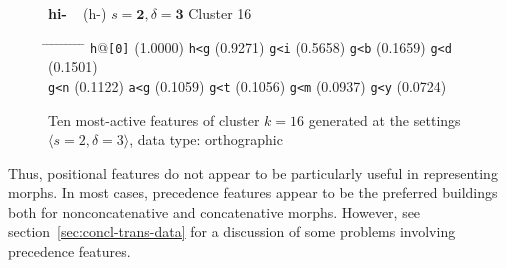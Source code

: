 \begin{figure}[ht] 
\begin{mdframed}
{\LARGE \textbf{hi-}} {\large\,\,\, (h-)} \hfill \large{$s=\textbf{2}, \delta=\textbf{3}$} \hfill Cluster 16\\
\vspace{-6pt}
\begin{normalsize}
\begin{tabbing}
\hspace{6ex} \= \hspace{10ex} \= \hspace{6ex} \= \hspace{10ex} \= \hspace{6ex} \= \hspace{10ex} \= \hspace{6ex} \= \hspace{10ex} \= \hspace{6ex} \= \hspace{10ex} \kill
\texttt{h}@\texttt{[0]} \> (1.0000) \> \texttt{h<g} \> (0.9271) \> \texttt{g<i} \> (0.5658) \> \texttt{g<b} \> (0.1659) \> \texttt{g<d} \> (0.1501) \\
\texttt{g<n} \> (0.1122) \> \texttt{a<g} \> (0.1059) \> \texttt{g<t} \> (0.1056) \> \texttt{g<m} \> (0.0937) \> \texttt{g<y} \> (0.0724)
\end{tabbing}
\end{normalsize}
\label{fig:cluster-16-2-3-O}
\caption{Ten most-active features of cluster $k = 16$ generated at the settings $\langle s=2,\delta=3 \rangle$, data type: orthographic}
\end{mdframed}
\end{figure}

Thus, positional features do not appear to be particularly useful in representing morphs. In most cases, precedence features appear to be the preferred buildings both for nonconcatenative and concatenative morphs. However, see section~\ref{sec:concl-trans-data} for a discussion of some problems involving precedence features.

